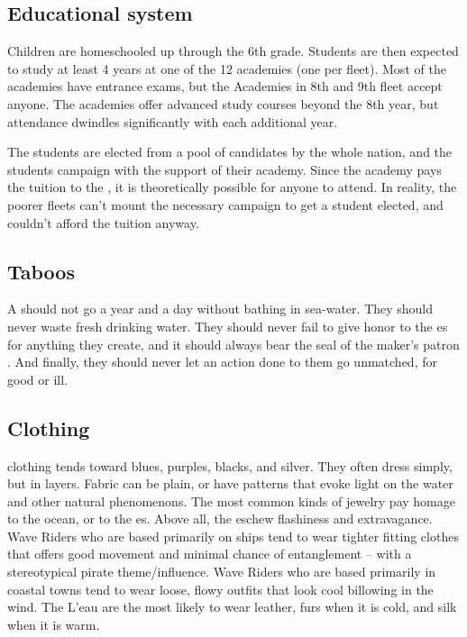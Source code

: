 \documentclass[blue]{GL2020}
\begin{document}
\subsection{Educational system}
Children are homeschooled up through the 6th grade. Students are then expected to study at least 4 years at one of the 12 academies (one per fleet). Most of the academies have entrance exams, but the Academies in 8th and 9th fleet accept anyone. The academies offer advanced study courses beyond the 8th year, but attendance dwindles significantly with each additional year.

The \pShip{} \pSchool{} students are elected from a pool of candidates by the whole nation, and the students campaign with the support of their academy. Since the academy pays the tuition to the \pSc{}, it is theoretically possible for anyone to attend. In reality, the poorer fleets can't mount the necessary campaign to get a student elected, and couldn't afford the tuition anyway.

\subsection*{Taboos}
A \pShippie{} should not go a year and a day without bathing in sea-water. They should never waste fresh drinking water. They should never fail to give honor to the \cEbb{\God}es for anything they create, and it should always bear the seal of the maker's patron \cEbb{\God}. And finally, they should never let an action done to them go unmatched, for good or ill.

\subsection{Clothing}
\pShip{} clothing tends toward blues, purples, blacks, and silver. They often dress simply, but in layers. Fabric can be plain, or have patterns that evoke light on the water and other natural phenomenons. The most common kinds of jewelry pay homage to the ocean, or to the \cEbb{\God}es. Above all, the \pShippies{} eschew flashiness and extravagance. Wave Riders who are based primarily on ships tend to wear tighter fitting clothes that offers good movement and minimal chance of entanglement – with a stereotypical pirate theme/influence. Wave Riders who are based primarily in coastal towns tend to wear loose, flowy outfits that look cool billowing in the wind. The L'eau are the most likely to wear leather, furs when it is cold, and silk when it is warm.
\end{document}
